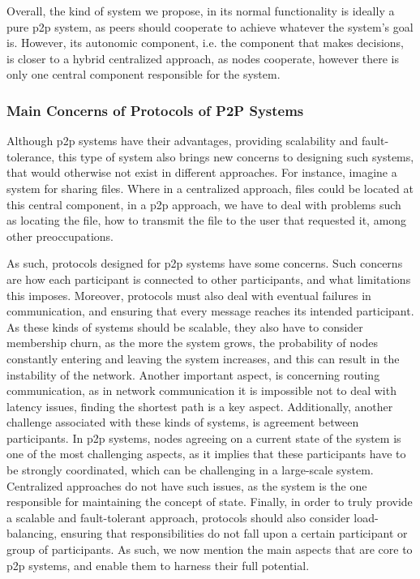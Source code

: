 Overall, the kind of system we propose, in its normal functionality is ideally a pure \gls{p2p} system, as peers should cooperate to achieve whatever the system's goal is. However, its autonomic component, i.e. the component that makes decisions, is closer to a hybrid centralized approach, as nodes cooperate, however there is only one central component responsible for the system.

\subsubsection{Main Concerns of Protocols of P2P Systems}
\label{sssec:main_concenrns_of_protocols_of_p2p_systems}
Although \gls{p2p} systems have their advantages, providing scalability and fault-tolerance\cite{Pourebrahimi2005}, this type of system also brings new concerns to designing such systems, that would otherwise not exist in different approaches. For instance, imagine a system for sharing files. Where in a centralized approach, files could be located at this central component, in a \gls{p2p} approach, we have to deal with problems such as locating the file, how to transmit the file to the user that requested it, among other preoccupations.

As such, protocols designed for \gls{p2p} systems have some concerns. Such concerns are how each participant is connected to other participants, and what limitations this imposes. Moreover, protocols must also deal with eventual failures in communication, and ensuring that every message reaches its intended participant. As these kinds of systems should be scalable, they also have to consider membership churn, as the more the system grows, the probability of nodes constantly entering and leaving the system increases\cite{Rodrigues2010, Ehiagwina2022}, and this can result in the instability of the network. Another important aspect, is concerning routing communication, as in network communication it is impossible not to deal with latency issues, finding the shortest path is a key aspect\cite{Alasaad2013, Maymounkov2002}. Additionally, another challenge associated with these kinds of systems, is agreement between participants. In \gls{p2p} systems, nodes agreeing on a current state of the system is one of the most challenging aspects, as it implies that these participants have to be strongly coordinated, which can be challenging in a large-scale system\cite{Xiao2019, Fischer1983}. Centralized approaches do not have such issues, as the system is the one responsible for maintaining the concept of state. Finally, in order to truly provide a scalable and fault-tolerant approach, protocols should also consider load-balancing, ensuring that responsibilities do not fall upon a certain participant or group of participants. As such, we now mention the main aspects that are core to \gls{p2p} systems, and enable them to harness their full potential.
